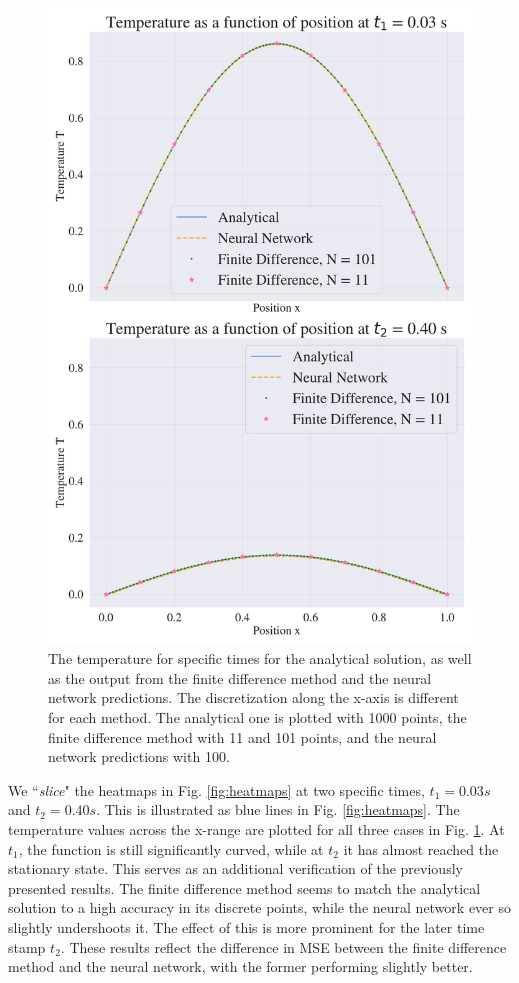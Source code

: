 \begin{figure}[h!]
    \centering
    \includegraphics[width=1.0\linewidth]{project_3/plots/time_slices_comparison.pdf}
    \caption{The temperature for specific times for the analytical solution, as well as the output from the finite difference method and the neural network predictions. The discretization along the x-axis is different for each method. The analytical one is plotted with 1000 points, the finite difference method with 11 and 101 points, and the neural network predictions with 100. }
    \label{fig:timeslices}
\end{figure}


We ``\textit{slice}" the heatmaps in Fig. \ref{fig:heatmaps} at two specific times, $t_1 = 0.03 s$ and $t_2 = 0.40 s$. 
This is illustrated as blue lines in Fig. \ref{fig:heatmaps}.
The temperature values across the x-range are plotted for all three cases in Fig. \ref{fig:timeslices}.
At $t_1$, the function is still significantly curved, while at $t_2$ it has almost reached the stationary state.
This serves as an additional verification of the previously presented results. 
The finite difference method seems to match the analytical solution to a high accuracy in its discrete points, while the neural network ever so slightly undershoots it.
The effect of this is more prominent for the later time stamp $t_2$. 
These results reflect the difference in MSE between the finite difference method and the neural network, with the former performing slightly better. 

